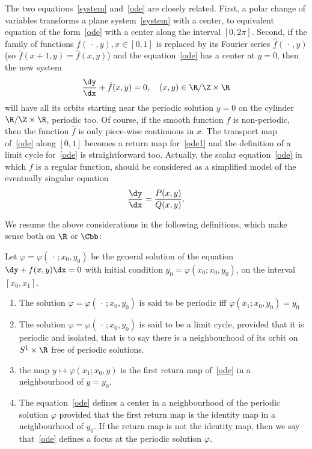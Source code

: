 The two equations~\eqref{system} and~\eqref{ode} are closely related. First, a polar change of variables transforms a plane system~\eqref{system} with a center, to equivalent equation of the form~\eqref{ode} with a center along the interval $[0,2\pi]$. Second, if the family of functions $f({\,\cdot\,},y), x\in [0,1]$ is replaced by its Fourier series $\hat{f}({\,\cdot\,},y)$ (so $\hat{f}(x+1,y) = \hat{f}(x,y)$) and the equation~\eqref{ode} has a center at $y=0$, then the new system
\begin{align}\label{ode1}
\frac{\dy}{\dx} + \hat{f}(x,y) = 0, \quad(x,y)\in \R / \Z \times \R
\end{align}
will have all its orbits starting near the periodic solution $y=0$ on the cylinder $ \R / \Z \times \R$, periodic too. Of course, if the smooth function $f$ is non-periodic, then the function $\hat{f}$ is only piece-wise continuous in $x$. The transport map of~\eqref{ode} along $[0,1]$ becomes a return map for~\eqref{ode1} and the definition of a limit cycle for~\eqref{ode} is straightforward too. Actually, the scalar equation~\eqref{ode} in which $f$ is a regular function, should be considered as a simplified model of the eventually singular equation
\[
\frac{\dy}{\dx} = \frac{P(x,y)}{Q(x,y)}.
\]

We resume the above considerations in the following definitions, which make sense both on $\R$ or $\Cbb$:
\begin{defi}\label{def1}
Let $ \varphi = \varphi({\,\cdot\,}; x_0,y_0)$ be the general solution of the equation $\dy + f(x,y)\dx=0$ with initial condition $y_0=\varphi(x_0; x_0,y_0)$, on the interval $ [x_0,x_1]$.
\begin{enumerate}\romanenumi
\item \label{list1.2.1}The solution $ \varphi = \varphi({\,\cdot\,}; x_0,y_0)$ is said to be periodic iff $\varphi(x_1; x_0,y_0) = y_0$
\item \label{list1.2.2}The solution $ \varphi = \varphi({\,\cdot\,}; x_0,y_0)$ is said to be a limit cycle, provided that it is periodic and isolated, that is to say there is a neighbourhood of its orbit on $S^1\times \R$ free of periodic solutions.
\item \label{list1.2.3}the map $y \mapsto \varphi(x_1; x_0,y) $ is the first return map of~\eqref{ode} in a neighbourhood of $ y=y_0$.
\item \label{list1.2.4}The equation~\eqref{ode} defines a center in a neighbourhood of the periodic solution $\varphi$ provided that the first return map is the identity map in a neighbourhood of $y_0$. If the return map is not the identity map, then we say that~\eqref{ode} defines a focus at the periodic solution $\varphi$.
\end{enumerate}
\end{defi}


